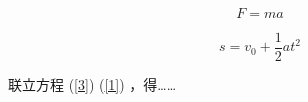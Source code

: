 \documentclass{article}
\begin{document}
\begin{CJK}{GBK}{song}

\begin{equation}\label{3}
F=ma
\end{equation}

\begin{equation}\label{1}
s=v_0+\frac{1}{2}at^2
\end{equation}



联立方程 (\ref{3})  (\ref{1}) ，得……     %

\end{CJK}
\end{document}
